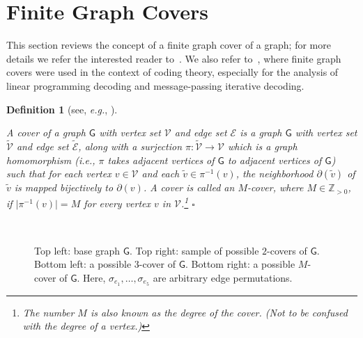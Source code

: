 \documentclass[journal, twocolumn]{IEEEtran}
\newcommand{\eg}{\emph{e.g.}}
\newcommand{\ie}{\emph{i.e.}}
\newcommand{\Z}{\mathbb{Z}}
\newcommand{\Zpp}{\Z_{>0}}
\newcommand{\set}[1]{\mathcal{#1}}
\newcommand{\graph}[1]{\mathsf{#1}}
\newcommand{\cover}[1]{\tilde{#1}}
\newcommand{\cset}[1]{\cover{\set{#1}}}
\newcommand{\?}{\mathrm{?}}
\newcommand{\qedwhite}{\hspace*{\fill}%
  $\square$\smallskip}
\newcommand{\defend}{\qedwhite}
\newcommand{\del}{\partial}
\newtheorem{Definition}[Lemma]{Definition}
\begin{document}
\section{Finite Graph Covers}
\label{sec:finite:graph:covers:1}


This section reviews the concept of a finite graph cover of a graph; for more
details we refer the interested reader to~\cite{Stark:Terras:96:1}. We also
refer to~\cite{Koetter:Vontobel:03:1, Vontobel:Koetter:05:1:subm,
  Koetter:Li:Vontobel:Walker:07:1, Kelley:Sridhara:07:1,
  Axvig:Dreher:Morrison:Psota:Perez:Walker:09:1}, where finite graph covers
were used in the context of coding theory, especially for the analysis of
linear programming decoding and message-passing iterative decoding.








\begin{Definition}[see, \eg, \cite{Massey:77:1, Stark:Terras:96:1}]
  \label{def:graph:cover:1}

  A {\em cover} of a graph $\graph{G}$ with vertex set $\set{V}$ and edge set
  $\set{E}$ is a graph $\graph{G}$ with vertex set $\cset{V}$ and edge set
  $\cset{E}$, along with a surjection $\pi: \cset{V} \to \set{V}$ which is a
  graph homomorphism (\ie, $\pi$ takes adjacent vertices of $\graph{G}$ to
  adjacent vertices of $\graph{G}$) such that for each vertex $v \in \set{V}$
  and each $\cover{v} \in \pi^{-1}(v)$, the neighborhood $\del(\cover{v})$ of
  $\cover{v}$ is mapped bijectively to $\del(v)$. A cover is called an {\em
    $M$-cover}, where $M \in \Zpp$, if $\bigl| \pi^{-1}(v) \bigr| = M$ for
  every vertex $v$ in $\set{V}$.\footnote{The number $M$ is also known as the
    degree of the cover. (Not to be confused with the degree of a vertex.)}
  \defend
\end{Definition}


\begin{figure}
  \begin{center}
     \\[1cm]
  \end{center}
  \caption{Top left: base graph $\graph{G}$. Top right: sample of possible
    $2$-covers of $\graph{G}$. Bottom left: a possible $3$-cover of
    $\graph{G}$. Bottom right: a possible $M$-cover of $\graph{G}$. Here,
    $\sigma_{e_1}, \ldots, \sigma_{e_5}$ are arbitrary edge
    permutations.}
  \label{fig:graph:cover:samples:1}
\end{figure}
\end{document}
